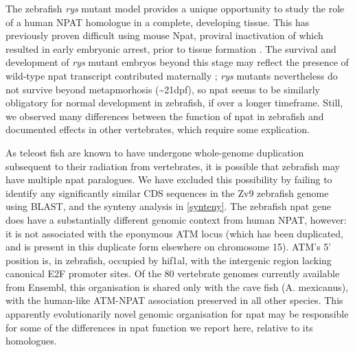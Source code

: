 The zebrafish \textit{rys} mutant model provides a unique opportunity to study the role of a human NPAT homologue in a complete, developing tissue. This has previously proven difficult using mouse Npat, proviral inactivation of which resulted in early embryonic arrest, prior to tissue formation \cite{DiFruscio1997}. The survival and development of \textit{rys} mutant embryos beyond this stage may reflect the presence of wild-type npat transcript contributed maternally \cite{Harvey2013}; \textit{rys} mutants nevertheless do not survive beyond metapmorhosis (\textasciitilde{}21dpf), so npat seems to be similarly obligatory for normal development in zebrafish, if over a longer timeframe. Still, we observed many differences between the function of npat in zebrafish and documented effects in other vertebrates, which require some explication.

As teleost fish are known to have undergone whole-genome duplication subsequent to their radiation from vertebrates, it is possible that zebrafish may have multiple npat paralogues. We have excluded this possibility by failing to identify any significantly similar CDS sequences in the Zv9 zebrafish genome using BLAST, and the synteny analysis in \autoref{synteny}. The zebrafish npat gene does have a substantially different genomic context from human NPAT, however: it is not associated with the eponymous ATM locus (which has been duplicated, and is present in this duplicate form elsewhere on chromosome 15). ATM’s 5’ position is, in zebrafish, occupied by hif1al, with the intergenic region lacking canonical E2F promoter sites. Of the 80 vertebrate genomes currently available from Ensembl, this organisation is shared only with the cave fish (A. mexicanus), with the human-like ATM-NPAT association preserved in all other species. This apparently evolutionarily novel genomic organisation for npat may be responsible for some of the differences in npat function we report here, relative to its homologues.

